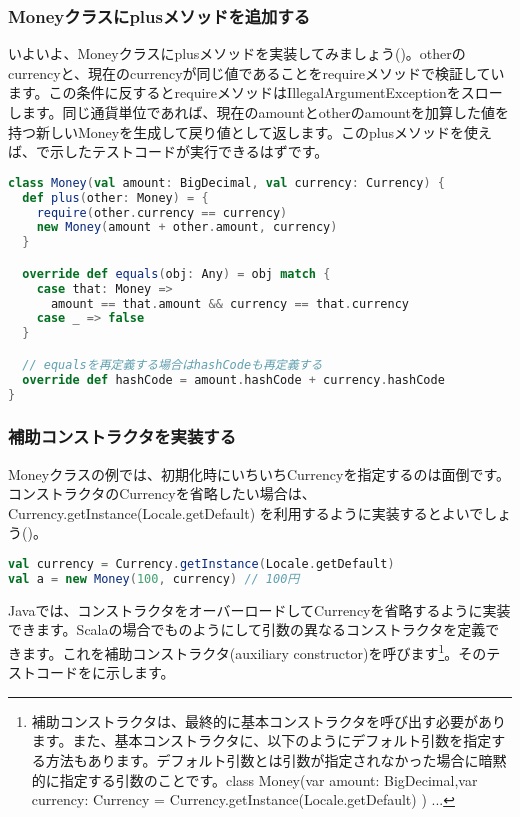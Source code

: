 \subsubsection{Moneyクラスにplusメソッドを追加する}
いよいよ、Moneyクラスにplusメソッドを実装してみましょう()。otherのcurrencyと、現在のcurrencyが同じ値であることをrequireメソッドで検証しています。この条件に反するとrequireメソッドはIllegalArgumentExceptionをスローします。同じ通貨単位であれば、現在のamountとotherのamountを加算した値を持つ新しいMoneyを生成して戻り値として返します。このplusメソッドを使えば、で示したテストコードが実行できるはずです。

\begin{lstlisting}[language=scala, label=src:money_plus, caption=plusメソッドを実装したMoneyクラス]
class Money(val amount: BigDecimal, val currency: Currency) {
  def plus(other: Money) = {
    require(other.currency == currency)
    new Money(amount + other.amount, currency)
  }

  override def equals(obj: Any) = obj match {
    case that: Money =>
      amount == that.amount && currency == that.currency
    case _ => false
  }

  // equalsを再定義する場合はhashCodeも再定義する
  override def hashCode = amount.hashCode + currency.hashCode
}
\end{lstlisting}

\subsubsection{補助コンストラクタを実装する}
Moneyクラスの例では、初期化時にいちいちCurrencyを指定するのは面倒です。コンストラクタのCurrencyを省略したい場合は、Currency.getInstance(Locale.getDefault) を利用するように実装するとよいでしょう()。

\begin{lstlisting}[language=scala, label=src:locale_default, caption=ほとんどの場合で次のようにして円の通貨単位を扱える]
val currency = Currency.getInstance(Locale.getDefault)
val a = new Money(100, currency) // 100円
\end{lstlisting}

Javaでは、コンストラクタをオーバーロードしてCurrencyを省略するように実装できます。Scalaの場合でものようにして引数の異なるコンストラクタを定義できます。これを補助コンストラクタ(auxiliary constructor)を呼びます\footnote{補助コンストラクタは、最終的に基本コンストラクタを呼び出す必要があります。また、基本コンストラクタに、以下のようにデフォルト引数を指定する方法もあります。デフォルト引数とは引数が指定されなかった場合に暗黙的に指定する引数のことです。class Money(var amount: BigDecimal,var currency: Currency = Currency.getInstance(Locale.getDefault) ) ...}。そのテストコードをに示します。

